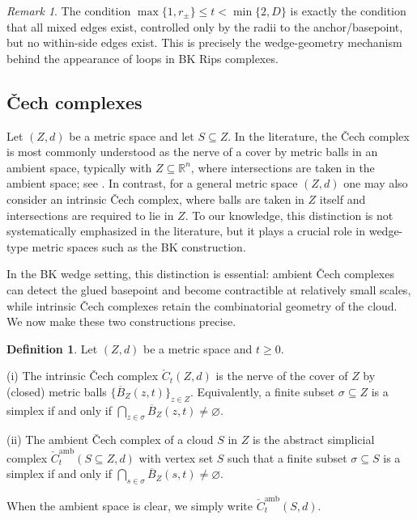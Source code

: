 \documentclass[11pt]{amsart}
\theoremstyle{definition}
\newtheorem{definition}[theorem]{Definition}
\theoremstyle{remark}
\newtheorem{remark}[theorem]{Remark}
\newcommand{\1}{\mathbbm{1}}
\begin{document}
\begin{remark}
The condition $\max\{1,r_{\pm}\}\le t<\min\{2,D\}$ is exactly the condition that all mixed edges exist, controlled only by the radii to the anchor/basepoint,
but no within-side edges exist.
This is precisely the wedge-geometry mechanism behind the appearance of loops in BK Rips complexes.
\end{remark}

\subsection{\v{C}ech complexes}

Let $(Z,d)$ be a metric space and let $S\subseteq Z$.
In the literature, the \v{C}ech complex is most commonly understood as the nerve of a cover by metric balls in an ambient space, typically with $Z\subseteq \mathbb{R}^n$, where intersections are taken in the ambient space; see \cite{EdelsbrunnerHarer, Oudot, deSilvaGhrist}.
In contrast, for a general metric space $(Z,d)$ one may also consider an intrinsic \v{C}ech complex, where balls are taken in $Z$ itself and intersections are required to lie in $Z$.
To our knowledge, this distinction is not systematically emphasized in the literature, but it plays a crucial role in wedge-type metric spaces such as the BK construction.

In the BK wedge setting, this distinction is essential: ambient \v{C}ech complexes can detect the glued basepoint and become contractible at relatively small scales, while intrinsic \v{C}ech complexes retain the combinatorial geometry of the cloud.
We now make these two constructions precise.

\begin{definition}
Let $(Z,d)$ be a metric space and $t\ge 0$.

(i) The intrinsic \v{C}ech complex $\check{C}_t(Z,d)$ is the nerve of the cover of $Z$ by
(closed) metric balls $\{ \overline{B}_Z(z,t)\}_{z\in Z}$.
Equivalently, a finite subset $\sigma\subseteq Z$ is a simplex if and only if $\bigcap_{z\in\sigma} \overline{B}_Z(z,t)\neq\varnothing.$

(ii) The ambient \v{C}ech complex of a cloud $S$ in $Z$ is the abstract simplicial complex $\check{C}^{\mathrm{amb}}_t(S\subseteq Z,d)$
with vertex set $S$ such that a finite subset $\sigma\subseteq S$ is a simplex if and only if $\bigcap_{s\in\sigma} \overline{B}_Z(s,t)\neq\varnothing.$

When the ambient space is clear, we simply write $\check{C}^{\mathrm{amb}}_t(S,d)$.
\end{definition}
\end{document}

